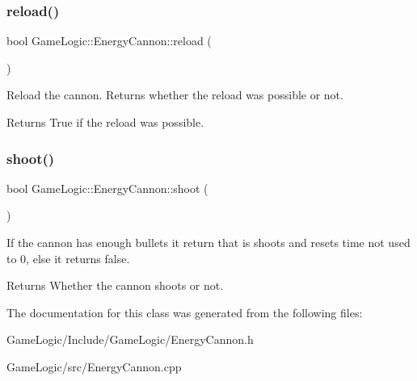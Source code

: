 \subsubsection{\texorpdfstring{reload()}{reload()}}
{\footnotesize\ttfamily bool Game\+Logic\+::\+Energy\+Cannon\+::reload (\begin{DoxyParamCaption}{ }\end{DoxyParamCaption})}

Reload the cannon. Returns whether the reload was possible or not. \begin{DoxyReturn}{Returns}
True if the reload was possible. 
\end{DoxyReturn}
\mbox{\label{classGameLogic_1_1EnergyCannon_a8028f1d9d52870997eae9335e9c494f5}} 
\subsubsection{\texorpdfstring{shoot()}{shoot()}}
{\footnotesize\ttfamily bool Game\+Logic\+::\+Energy\+Cannon\+::shoot (\begin{DoxyParamCaption}{ }\end{DoxyParamCaption})}

If the cannon has enough bullets it return that is shoots and resets time not used to 0, else it returns false. \begin{DoxyReturn}{Returns}
Whether the cannon shoots or not. 
\end{DoxyReturn}


The documentation for this class was generated from the following files\+:\begin{DoxyCompactItemize}
\item 
Game\+Logic/\+Include/\+Game\+Logic/Energy\+Cannon.\+h\item 
Game\+Logic/src/Energy\+Cannon.\+cpp\end{DoxyCompactItemize}
